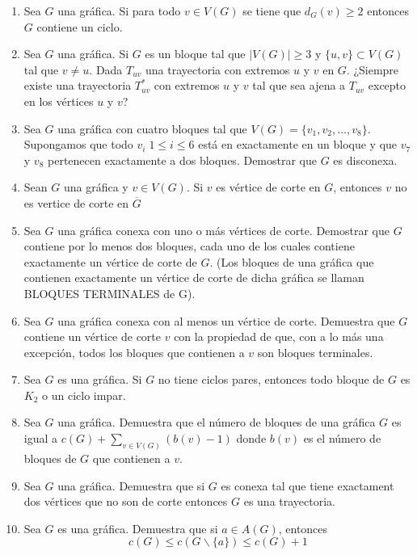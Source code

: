 \documentclass[12pts]{report}
\begin{document}
\begin{enumerate}
\item Sea $G$ una gráfica. Si para todo $v\in V(G)$ se tiene que $d_G(v)\geq 2$ entonces $G$ contiene un ciclo.


\item Sea $G$ una gráfica. Si $G$ es un bloque tal que $|V(G)|\geq 3$ y $\{u,v\}\subset V(G)$ tal que $v\neq u$. Dada $T_{uv}$ una trayectoria con extremos $u$ y $v$ en $G$. ¿Siempre existe una trayectoria $T_{uv}^{*}$ con extremos $u$ y $v$ tal que sea ajena a $T_{uv}$ excepto en los vértices $u$ y $v$?

\item Sea $G$ una gráfica con cuatro bloques tal que $V(G)=\{v_1,v_2,\dots, v_8\}$. Supongamos que todo $v_i\; 1\leq i \leq 6$ está en exactamente en un bloque y que $v_7$ y $v_8$ pertenecen exactamente a dos bloques. Demostrar que $G$ es disconexa.

\item Sean $G$ una gráfica y $v\in V(G)$. Si $v$ es vértice de corte en $G$, entonces $v$ no es vertice de corte en $\overline{G}$

\item Sea $G$ una gráfica conexa con uno o más vértices de corte. Demostrar que $G$ contiene por lo menos dos bloques, cada uno de los cuales contiene exactamente un vértice de corte de $G$. (Los bloques de una gráfica que contienen exactamente un vértice de corte de dicha gráfica se llaman BLOQUES TERMINALES de G).


\item Sea $G$ una gráfica conexa con al menos un vértice de corte. Demuestra que $G$ contiene un vértice de corte $v$ con la propiedad de que, con a lo más una excepción, todos los bloques que contienen a $v$ son bloques terminales.
\item Sea $G$ es una gráfica. Si $G$ no tiene ciclos pares, entonces todo bloque de $G$ es $K_2$ o un ciclo impar.

\item Sea $G$ una gráfica. Demuestra que el número de bloques de una gráfica $G$ es igual a $c(G)+ \sum_{v\in V(G)}(b(v)-1)$ donde $b(v)$ es el número de bloques de $G$ que contienen a $v$.
\item Sea $G$ una gráfica. Demuestra que si $G$ es conexa tal que tiene exactament dos vértices que no son de corte entonces $G$ es una trayectoria.
\item Sea $G$ es una gráfica. Demuestra que si $a\in A(G)$, entonces $$c(G)\leq c(G\backslash \{a\}) \leq c(G)+1$$
\end{enumerate}
\end{document}
